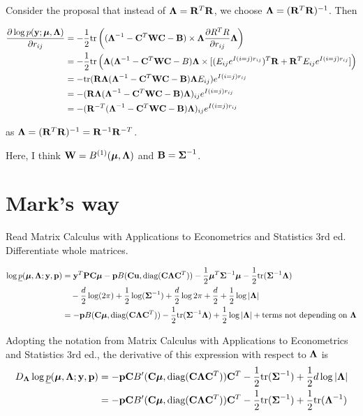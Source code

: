 \documentclass{article}[12pt]
\begin{document}
\noindent Consider the proposal that instead of $\mLambda = \mR^T \mR$, we choose
$\mLambda = (\mR^T \mR)^{-1}$. Then

\begin{align*}
\frac{\partial \log p(\vy; \vmu, \mLambda)}{\partial r_{ij}} &= - \half \tr \left( (\mLambda^{-1} - \mC^T \mW \mC - \mB) \times \mLambda \frac{\partial R^T R}{\partial r_{ij}} \mLambda \right) \\
&= - \half \tr \left( \mLambda(\mLambda^{-1} - \mC^T\mW\mC - B)\mLambda \times [(E_{ij} e^{I(i=j)r_{ij}})^T \mR + \mR^T E_{ij} e^{I(i=j) r_{ij}}] \right) \\
&= - \tr (\mR \mLambda (\mLambda^{-1} - \mC^T \mW \mC - \mB) \mLambda E_{ij})e^{I(i=j) r_{ij}} \\
&= - (\mR \mLambda (\mLambda^{-1} - \mC^T \mW \mC - \mB) \mLambda)_{ij} e^{I(i=j) r_{ij}} \\
&= - (\mR^{-T} (\mLambda^{-1} - \mC^T \mW \mC - \mB) \mLambda)_{ij} e^{I(i=j) r_{ij}}
\end{align*}

\noindent as $\mLambda = (\mR^T \mR)^{-1} = \mR^{-1} \mR^{-T}$.

\noindent Here, I think $\mW = B^{(1)}(\vmu, \mLambda)$ and $\mB = \mSigma^{-1}$.

\section{Mark's way}

Read Matrix Calculus with Applications to Econometrics and 
Statistics 3rd ed. Differentiate whole matrices.

\begin{align*}
\log \underline{p}(\vmu, \mLambda; \vy, \vp) &= \vy^T \mP \mC \vmu - \vp B(\mC \vu, \diag{(\mC \mLambda \mC^T)}) - \half \vmu^T \mSigma^{-1} \vmu - \half \tr{(\mSigma^{-1} \mLambda)} \\
&\quad - \frac{d}{2} \log(2 \pi) + \half \log(\mSigma^{-1}) + \frac{d}{2} \log{2 \pi} + \frac{d}{2} + \half \log |\mLambda| \\
&= -\vp B(\mC \vmu, \diag{(\mC \mLambda \mC^T)}) - \half \tr{(\mSigma^{-1} \mLambda)} + \half \log |\mLambda| + \text{terms not depending on $\mLambda$}
\end{align*}

\noindent Adopting the notation from Matrix Calculus with Applications to Econometrics and 
Statistics 3rd ed., the derivative of this expression with respect to $\mLambda$ is
\begin{align*}
D_\mLambda \log \underline{p}(\vmu, \mLambda; \vy, \vp) &= -\vp \mC B'(\mC \vmu, \diag{(\mC \mLambda \mC^T)}) \mC^T - \half \tr{(\mSigma^{-1})} + \half d \log |\mLambda| \\
 &=-\vp \mC B'(\mC \vmu, \diag{(\mC \mLambda \mC^T)}) \mC^T - \half \tr{(\mSigma^{-1})} + \half \tr{(\mLambda^{-1})}
\end{align*}
\end{document}
